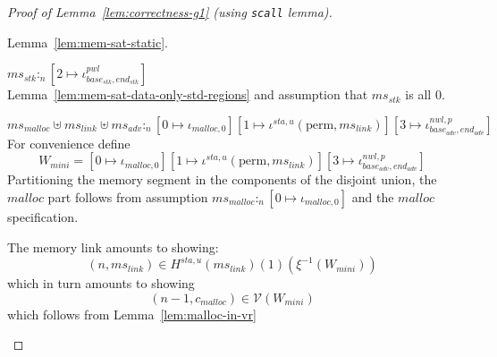 \documentclass[a4paper]{article}
\newcommand{\var}[1]{\mathit{#1}}
\newcommand{\hs}{\var{ms}}
\newcommand{\ms}{\hs}
\newcommand{\start}{\var{base}}
\newcommand{\addrend}{\var{end}}
\newcommand{\heap}{\var{mem}}
\newcommand{\adv}{\var{adv}}
\newcommand{\link}{\var{link}}
\newcommand{\stk}{\var{stk}}
\newcommand{\nwl}{\var{nwl}}
\newcommand{\pwl}{\var{pwl}}
\newcommand{\sta}{\var{sta}}
\newcommand{\heapSat}[3][\heap]{#1 :_{#2} #3}
\newcommand{\memSat}[3][n]{\heapSat[#2]{#1}{#3}}
\newcommand{\codelabel}[1]{\mathit{#1}}
\newcommand{\malloc}{\codelabel{malloc}}
\newcommand{\asmType}{\plaindom{AsmType}}
\newcommand{\plaindom}[1]{\mathrm{#1}}
\newcommand{\intr}[2]{\mathcal{#1}}
\newcommand{\valueintr}[1]{\intr{V}{#1}}
\newcommand{\stdvr}{\valueintr{\asmType}}
\newcommand{\npair}[2][n]{\left(#1,#2 \right)}
\newcommand{\plainview}[1]{\mathrm{#1}}
\newcommand{\perma}{\plainview{perm}}
\begin{document}
\begin{proof}[Proof of Lemma~\ref{lem:correctness-g1} (using \texttt{scall} lemma)]
\begin{enumproof}[resume]
\begin{enumproof}
          Lemma~\ref{lem:mem-sat-static}.
        \item $\memSat{\ms_\stk}{[2 \mapsto \iota^\pwl_{\start_\stk,\addrend_\stk}]}$\\
          Lemma~\ref{lem:mem-sat-data-only-std-regions} and assumption that $\ms_\stk$ is all 0.
        \item $\memSat{\ms_{\malloc} \uplus \ms_\link \uplus \ms_\adv}{[0 \mapsto \iota_{\malloc,0}][1 \mapsto \iota^{\sta,u} (\perma,\ms_\link)][3 \mapsto \iota^{\nwl,p}_{\start_\adv,\addrend_\adv}]}$\\
          For convenience define
          \[
            W_{\var{mini}} = [0 \mapsto \iota_{\malloc,0}][1 \mapsto \iota^{\sta,u} (\perma,\ms_\link)][3 \mapsto \iota^{\nwl,p}_{\start_\adv,\addrend_\adv}]
          \]
          Partitioning the memory segment in the components of the disjoint union, the $\malloc$ part follows from assumption $\memSat{\ms_\malloc}{[0 \mapsto \iota_{\malloc,0}]}$ and the $\malloc$ specification.

          The memory link amounts to showing:
          \[
            \npair[n]{\ms_\link} \in H^{\sta,u}(\ms_\link)(1)(\xi^{-1}(W_{\var{mini}}))
          \]
          which in turn amounts to showing
          \[
            \npair[n-1]{c_\malloc} \in \stdvr(W_{\var{mini}})
          \]
          which follows from Lemma~\ref{lem:malloc-in-vr}


\end{enumproof}
\end{enumproof}
\end{proof}
\end{document}
